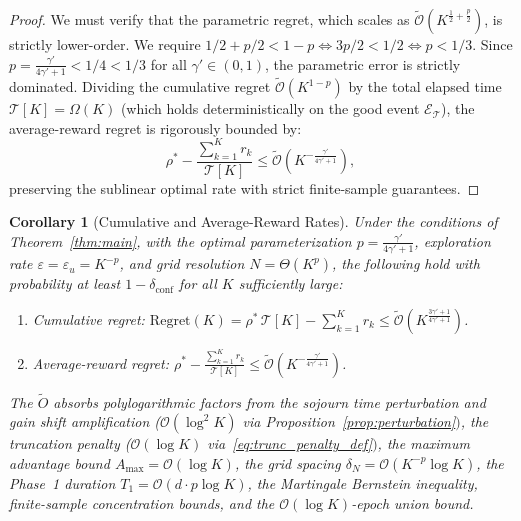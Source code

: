\documentclass[letterpaper, 10 pt, conference]{IEEEconf}
\newtheorem{corollary}{Corollary}
\begin{document}
\begin{proof}
    We must verify that the parametric regret, which scales as $\widetilde{\mathcal{O}}(K^{\frac{1}{2} + \frac{p}{2}})$, is strictly lower-order. We require $1/2 + p/2 < 1 - p \iff 3p/2 < 1/2 \iff p < 1/3$. Since $p = \frac{\gamma'}{4\gamma'+1} < 1/4 < 1/3$ for all $\gamma' \in (0,1)$, the parametric error is strictly dominated. Dividing the cumulative regret $\widetilde{\mathcal{O}}(K^{1-p})$ by the total elapsed time $\mathcal{T}[K] = \Omega(K)$ (which holds deterministically on the good event $\mathcal{E}_{\mathcal{T}}$), the average-reward regret is rigorously bounded by:
    \begin{equation}
        \rho^* - \frac{\sum_{k=1}^K r_k}{\mathcal{T}[K]} \le \widetilde{\mathcal{O}}\left(K^{-\frac{\gamma'}{4\gamma'+1}}\right),
    \end{equation}
    preserving the sublinear optimal rate with strict finite-sample guarantees.
\end{proof}

\begin{corollary}[Cumulative and Average-Reward Rates]
    \label{cor:rate}
    Under the conditions of Theorem~\ref{thm:main}, with the optimal parameterization $p = \frac{\gamma'}{4\gamma'+1}$, exploration rate $\varepsilon = \varepsilon_u = K^{-p}$, and grid resolution $N = \Theta(K^{p})$, the following hold with probability at least $1 - \delta_{\mathrm{conf}}$ for all $K$ sufficiently large:
    \begin{enumerate}
        \item \emph{Cumulative regret:} $\displaystyle \mathrm{Regret}(K) = \rho^*\,\mathcal{T}[K] - \sum_{k=1}^K r_k \leq \widetilde{\mathcal{O}}\left(K^{\frac{3\gamma'+1}{4\gamma'+1}}\right)$.
        \item \emph{Average-reward regret:} $\displaystyle \rho^* - \frac{\sum_{k=1}^K r_k}{\mathcal{T}[K]} \leq \widetilde{\mathcal{O}}\left(K^{-\frac{\gamma'}{4\gamma'+1}}\right)$.
    \end{enumerate}
    The $\widetilde{O}$ absorbs polylogarithmic factors from the sojourn time perturbation and gain shift amplification ($\mathcal{O}(\log^2 K)$ via Proposition~\ref{prop:perturbation}$)$, the truncation penalty ($\mathcal{O}(\log K)$ via~\eqref{eq:trunc_penalty_def}$)$, the maximum advantage bound $A_{\max} = \mathcal{O}(\log K)$, the grid spacing $\delta_N = \mathcal{O}(K^{-p}\log K)$, the Phase~1 duration $T_1 = \mathcal{O}(d \cdot p \log K)$, the Martingale Bernstein inequality, finite-sample concentration bounds, and the $\mathcal{O}(\log K)$-epoch union bound.
\end{corollary}


\end{document}

